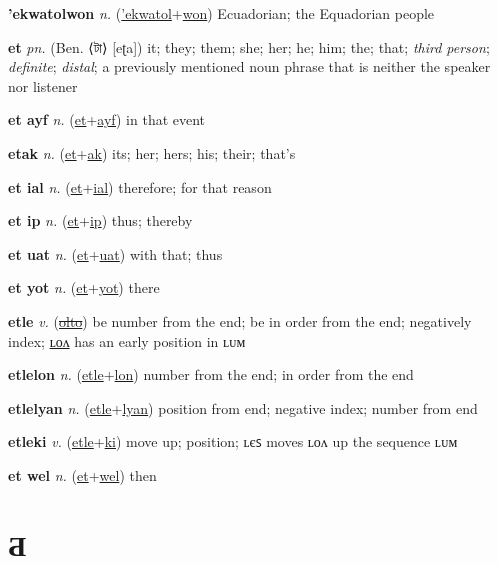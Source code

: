 \textbf{\hypertarget{'ekwatolwon}{'ekwatolwon}} \textit{n.} (\hyperlink{'ekwatol}{'ekwatol}+\allowbreak \hyperlink{won}{won})
Ecuadorian; the Equadorian people

\textbf{\hypertarget{et}{et}} \textit{pn.} (Ben. ⟨{\bengali{}টা}⟩ [eʈa])
it; they; them; she; her; he; him; the; that; \textit{third person}; \textit{definite}; \textit{distal}; a previously mentioned noun phrase that is neither the speaker nor listener

\textbf{\hypertarget{et ayf}{et ayf}} \textit{n.} (\hyperlink{et}{et}+\allowbreak \hyperlink{ayf}{ayf})
in that event

\textbf{\hypertarget{etak}{etak}} \textit{n.} (\hyperlink{et}{et}+\allowbreak \hyperlink{ak}{ak})
its; her; hers; his; their; that’s

\textbf{\hypertarget{et ial}{et ial}} \textit{n.} (\hyperlink{et}{et}+\allowbreak \hyperlink{ial}{ial})
therefore; for that reason

\textbf{\hypertarget{et ip}{et ip}} \textit{n.} (\hyperlink{et}{et}+\allowbreak \hyperlink{ip}{ip})
thus; thereby

\textbf{\hypertarget{et uat}{et uat}} \textit{n.} (\hyperlink{et}{et}+\allowbreak \hyperlink{uat}{uat})
with that; thus

\textbf{\hypertarget{et yot}{et yot}} \textit{n.} (\hyperlink{et}{et}+\allowbreak \hyperlink{yot}{yot})
there

\textbf{\hypertarget{etle}{etle}} \textit{v.} (\hyperlink{olto}{\sout{olto}})
be number from the end; be in order from the end; negatively index; \hyperlink{etlelon}{ʟᴏᴧ} has an early position in ʟᴜᴍ

\textbf{\hypertarget{etlelon}{etlelon}} \textit{n.} (\hyperlink{etle}{etle}+\allowbreak \hyperlink{lon}{lon})
number from the end; in order from the end

\textbf{\hypertarget{etlelyan}{etlelyan}} \textit{n.} (\hyperlink{etle}{etle}+\allowbreak \hyperlink{lyan}{lyan})
position from end; negative index; number from end

\textbf{\hypertarget{etleki}{etleki}} \textit{v.} (\hyperlink{etle}{etle}+\allowbreak \hyperlink{ki}{ki})
move up; position; ʟєꜱ moves ʟᴏᴧ up the sequence ʟᴜᴍ

\textbf{\hypertarget{et wel}{et wel}} \textit{n.} (\hyperlink{et}{et}+\allowbreak \hyperlink{wel}{wel})
then

\section{Ƌ}

